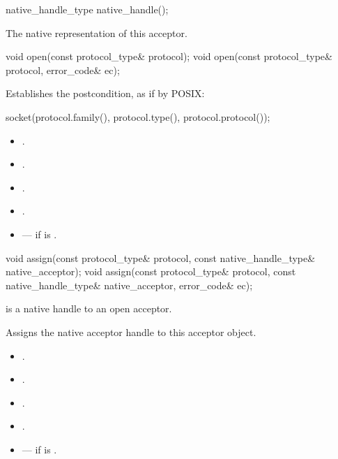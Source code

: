 \begin{itemdecl}
native_handle_type native_handle();
\end{itemdecl}

\begin{itemdescr}
\pnum
\returns The native representation of this acceptor.
\end{itemdescr}

\begin{itemdecl}
void open(const protocol_type& protocol);
void open(const protocol_type& protocol, error_code& ec);
\end{itemdecl}

\begin{itemdescr}
\pnum
\effects Establishes the postcondition, as if by POSIX:
\begin{codeblock}
socket(protocol.family(), protocol.type(), protocol.protocol());
\end{codeblock}

\pnum
\postconditions
\begin{itemize}
\item
{}.
\item
{}.
\item
{}.
\item
{}.
\end{itemize}

\pnum
\errors
\begin{itemize}
\item
{} --- if  is .
\end{itemize}
\end{itemdescr}

\begin{itemdecl}
void assign(const protocol_type& protocol,
            const native_handle_type& native_acceptor);
void assign(const protocol_type& protocol,
            const native_handle_type& native_acceptor, error_code& ec);
\end{itemdecl}

\begin{itemdescr}
\pnum
\requires {} is a native handle to an open acceptor.

\pnum
\effects Assigns the native acceptor handle to this acceptor object.

\pnum
\postconditions
\begin{itemize}
\item
{}.
\item
{}.
\item
{}.
\item
{}.
\end{itemize}

\pnum
\errors
\begin{itemize}
\item
{} --- if  is .
\end{itemize}
\end{itemdescr}

